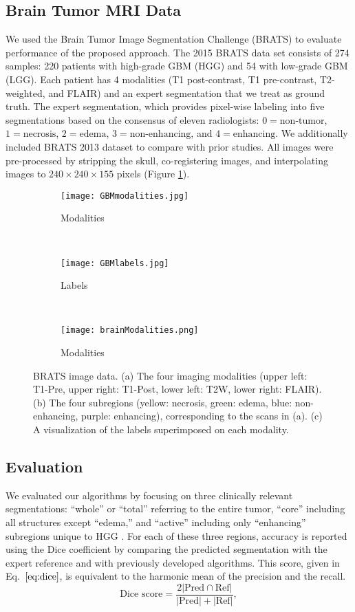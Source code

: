 \documentclass{llncs}
\begin{document}
\subsection{Brain Tumor MRI Data}
We used the Brain Tumor Image Segmentation Challenge (BRATS)\cite{brats} to evaluate performance of the proposed approach.  The 2015 BRATS data set consists of 274 samples: 220 patients with high-grade GBM (HGG) and 54 with low-grade GBM (LGG).  Each patient has 4 modalities (T1 post-contrast, T1 pre-contrast, T2-weighted, and FLAIR) and an expert segmentation that we treat as ground truth. The expert segmentation, which provides pixel-wise labeling into five segmentations based on the consensus of eleven radiologists: $0 = \text{non-tumor}$, $1 = \text{necrosis}$, $2 = \text{edema}$, $3 = \text{non-enhancing}$, and $4 = \text{enhancing}$. We additionally included BRATS 2013 dataset to compare with prior studies. All images were pre-processed by stripping the skull, co-registering images, and interpolating images to $240 \times 240 \times 155$ pixels (Figure \ref{fig:data}).
\begin{figure}[htb]
	\centering
	\begin{subfigure}[h]{0.23\textwidth}
		\texttt{[image: GBMmodalities.jpg]}
		\caption{Modalities}
	\end{subfigure}
	~
	\begin{subfigure}[h]{0.23\textwidth}
		\texttt{[image: GBMlabels.jpg]}
		\caption{Labels}
	\end{subfigure}
	~
	\begin{subfigure}[h]{0.23\textwidth}
		\texttt{[image: brainModalities.png]}
		\caption{Modalities}
	\end{subfigure}
	\caption{{BRATS image data.} \small{(a) The four imaging modalities (upper left: T1-Pre, upper right: T1-Post, lower left: T2W, lower right: FLAIR).  (b) The four subregions (yellow: necrosis, green: edema, blue: non-enhancing, purple: enhancing), corresponding to the scans in (a).  (c)  A visualization of the labels superimposed on each modality.}}
	\label{fig:data}
\end{figure}

\subsection{Evaluation}
We evaluated our algorithms by focusing on three clinically relevant segmentations: ``whole'' or ``total'' referring to the entire tumor, ``core'' including all structures except ``edema,'' and ``active'' including only ``enhancing'' subregions unique to HGG \cite{brats}. For each of these three regions, accuracy is reported using the Dice coefficient by comparing the predicted segmentation  with the expert reference and with previously developed algorithms. This score, given in Eq.~$\ref{eq:dice}$, is equivalent to the harmonic mean of the precision and the recall.
\begin{equation}\label{eq:dice}
\text{Dice score} = \frac{2 \left| \text{Pred} \cap \text{Ref} \right|}{\left| \text{Pred} \right| + \left| \text{Ref} \right|},
\end{equation}
\end{document}
